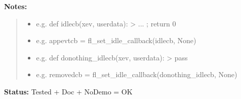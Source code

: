 \begin{boxedminipage}{\funcwidth}
\begin{quote}
      \end{quote}

\textbf{Notes:}
\begin{quote}
  \begin{itemize}

  \item
    \setlength{\parskip}{0.6ex}

e.g. def idlecb(xev, userdata): > ... ; return 0


  \item 
e.g. appevtcb = fl\_set\_idle\_callback(idlecb, None)


  \item 
e.g. def donothing\_idlecb(xev, userdata): > pass


  \item 
e.g. removedcb = fl\_set\_idle\_callback(donothing\_idlecb, None)


\end{itemize}

\end{quote}

\textbf{Status:} 
Tested + Doc + NoDemo = OK


    \end{boxedminipage}

    \label{xformslib:flxbasic:fl_addto_selected_xevent}

    \vspace{0.5ex}

